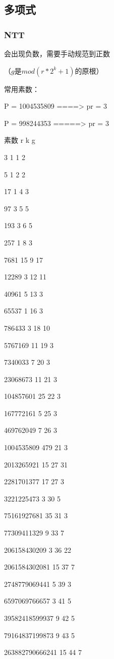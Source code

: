 \documentclass[UTF8]{ctexart}
\begin{document}
\subsection{多项式}
\subsubsection{NTT}
会出现负数，需要手动规范到正数

（$g $是$mod(r*2^k+1)$的原根）

常用素数：

P = 1004535809  ====>  pr = 3

P = 998244353  =====>  pr = 3

素数  r  k  g

3   1   1   2

5   1   2   2

17  1   4   3

97  3   5   5

193 3   6   5

257 1   8   3

7681    15  9   17

12289   3   12  11

40961   5   13  3

65537   1   16  3

786433  3   18  10

5767169 11  19  3

7340033 7   20  3

23068673    11  21  3

104857601   25  22  3

167772161   5   25  3

469762049   7   26  3

1004535809  479 21  3

2013265921  15  27  31

2281701377  17  27  3

3221225473  3   30  5

75161927681 35  31  3

77309411329 9   33  7

206158430209    3   36  22

2061584302081   15  37  7

2748779069441   5   39  3

6597069766657   3   41  5

39582418599937  9   42  5

79164837199873  9   43  5

263882790666241 15  44  7
\end{document}
